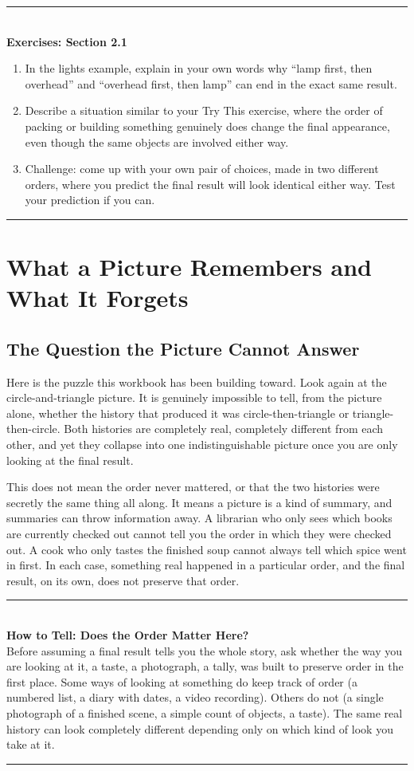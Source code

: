 \documentclass[11pt]{book}
\newenvironment{algorithmproc}[1]{%
\vspace{0.6em}\noindent\rule{\linewidth}{0.6pt}\\[0.2em]\textbf{How to Tell: #1}\\[0.3em]}%
{\\[0.2em]\noindent\rule{\linewidth}{0.6pt}\vspace{0.6em}}
\newenvironment{exercisebox}[1]{%
\vspace{0.8em}\noindent\rule{\linewidth}{0.6pt}\\[0.2em]\textbf{Exercises: #1}\\[0.3em]%
\begin{enumerate}[label=\arabic*., itemsep=0.4em]}%
{\end{enumerate}\noindent\rule{\linewidth}{0.6pt}\vspace{0.6em}}
\begin{document}
\begin{exercisebox}{Section 2.1}
\item In the lights example, explain in your own words why ``lamp first, then overhead'' and ``overhead first, then lamp'' can end in the exact same result.
\item Describe a situation similar to your Try This exercise, where the order of packing or building something genuinely does change the final appearance, even though the same objects are involved either way.
\item Challenge: come up with your own pair of choices, made in two different orders, where you predict the final result will look identical either way. Test your prediction if you can.
\end{exercisebox}

\chapter{What a Picture Remembers and What It Forgets}

\section{The Question the Picture Cannot Answer}

Here is the puzzle this workbook has been building toward. Look again at the circle-and-triangle picture. It is genuinely impossible to tell, from the picture alone, whether the history that produced it was circle-then-triangle or triangle-then-circle. Both histories are completely real, completely different from each other, and yet they collapse into one indistinguishable picture once you are only looking at the final result.

This does not mean the order never mattered, or that the two histories were secretly the same thing all along. It means a picture is a kind of summary, and summaries can throw information away. A librarian who only sees which books are currently checked out cannot tell you the order in which they were checked out. A cook who only tastes the finished soup cannot always tell which spice went in first. In each case, something real happened in a particular order, and the final result, on its own, does not preserve that order.

\begin{algorithmproc}{Does the Order Matter Here?}
Before assuming a final result tells you the whole story, ask whether the way you are looking at it, a taste, a photograph, a tally, was built to preserve order in the first place. Some ways of looking at something do keep track of order (a numbered list, a diary with dates, a video recording). Others do not (a single photograph of a finished scene, a simple count of objects, a taste). The same real history can look completely different depending only on which kind of look you take at it.
\end{algorithmproc}
\end{document}
